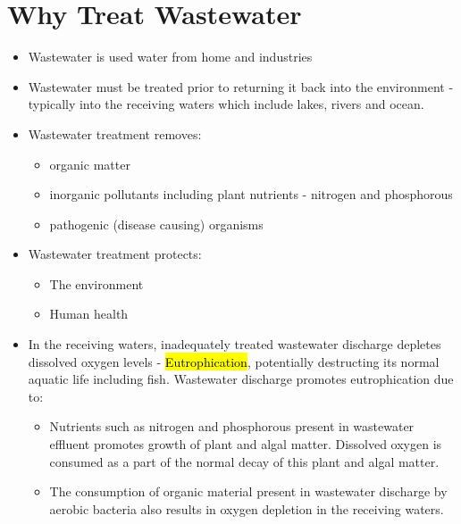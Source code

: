\section{Why Treat Wastewater}
\begin{itemize}
\item Wastewater is used water from home and industries\\
\item Wastewater must be treated prior to returning it back into the environment - typically into the receiving waters which include lakes, rivers and ocean.


\item Wastewater treatment removes:
\begin{itemize}
\item organic matter
\item inorganic  pollutants including plant nutrients - nitrogen and phosphorous\\
\item pathogenic (disease causing) organisms\\
\end{itemize}

\item Wastewater treatment protects:
\begin{itemize}
\item The environment
\item Human health
\end{itemize}

\item In the receiving waters, inadequately treated wastewater discharge depletes dissolved oxygen levels - \hl{Eutrophication}, potentially destructing its normal aquatic life including fish.  Wastewater discharge promotes eutrophication due to:

\begin{itemize}
\item Nutrients such as nitrogen and phosphorous present in wastewater effluent promotes growth of plant and algal matter.  Dissolved oxygen is consumed as a part of the normal decay of this plant and algal matter.  
\item The consumption of organic material present in wastewater discharge by aerobic bacteria also results in oxygen depletion in the receiving waters.  


\end{itemize}
\end{itemize}

